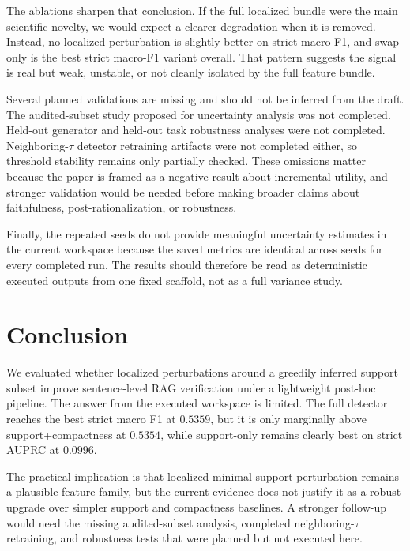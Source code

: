 \documentclass{article}
\begin{document}
The ablations sharpen that conclusion. If the full localized bundle were the main scientific novelty, we would expect a clearer degradation when it is removed. Instead, no-localized-perturbation is slightly better on strict macro F1, and swap-only is the best strict macro-F1 variant overall. That pattern suggests the signal is real but weak, unstable, or not cleanly isolated by the full feature bundle.

Several planned validations are missing and should not be inferred from the draft. The audited-subset study proposed for uncertainty analysis was not completed. Held-out generator and held-out task robustness analyses were not completed. Neighboring-$\tau$ detector retraining artifacts were not completed either, so threshold stability remains only partially checked. These omissions matter because the paper is framed as a negative result about incremental utility, and stronger validation would be needed before making broader claims about faithfulness, post-rationalization, or robustness.

Finally, the repeated seeds do not provide meaningful uncertainty estimates in the current workspace because the saved metrics are identical across seeds for every completed run. The results should therefore be read as deterministic executed outputs from one fixed scaffold, not as a full variance study.

\section{Conclusion}
We evaluated whether localized perturbations around a greedily inferred support subset improve sentence-level RAG verification under a lightweight post-hoc pipeline. The answer from the executed workspace is limited. The full detector reaches the best strict macro F1 at $0.5359$, but it is only marginally above support+compactness at $0.5354$, while support-only remains clearly best on strict AUPRC at $0.0996$.

The practical implication is that localized minimal-support perturbation remains a plausible feature family, but the current evidence does not justify it as a robust upgrade over simpler support and compactness baselines. A stronger follow-up would need the missing audited-subset analysis, completed neighboring-$\tau$ retraining, and robustness tests that were planned but not executed here.



\end{document}
